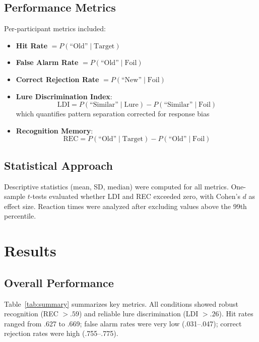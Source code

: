 \documentclass[12pt]{article}
\begin{document}
\subsection{Performance Metrics}

Per-participant metrics included:  
\begin{itemize}[nosep, leftmargin=1.5em]
\item \textbf{Hit Rate} $= P(\text{``Old''} \mid \text{Target})$
\item \textbf{False Alarm Rate} $= P(\text{``Old''} \mid \text{Foil})$
\item \textbf{Correct Rejection Rate} $= P(\text{``New''} \mid \text{Foil})$ 
\item \textbf{Lure Discrimination Index}:
\begin{equation}
    \text{LDI} = P(\text{``Similar''} \mid \text{Lure}) - P(\text{``Similar''} \mid \text{Foil})
\end{equation}
which quantifies pattern separation corrected for response bias \citep{stark2013mnemonic}
\item \textbf{Recognition Memory}:
\begin{equation}
    \text{REC} = P(\text{``Old''} \mid \text{Target}) - P(\text{``Old''} \mid \text{Foil})
\end{equation}
\end{itemize}
\subsection{Statistical Approach}

Descriptive statistics (mean, SD, median) were computed for all metrics. One-sample $t$-tests evaluated whether LDI and REC exceeded zero, with Cohen's $d$ as effect size. Reaction times were analyzed after excluding values above the 99th percentile.

\section{Results}

\subsection{Overall Performance}

Table~\ref{tab:summary} summarizes key metrics. All conditions showed robust recognition (REC $> .59$) and reliable lure discrimination (LDI $> .26$). Hit rates ranged from .627 to .669; false alarm rates were very low (.031--.047); correct rejection rates were high (.755--.775).
\end{document}
